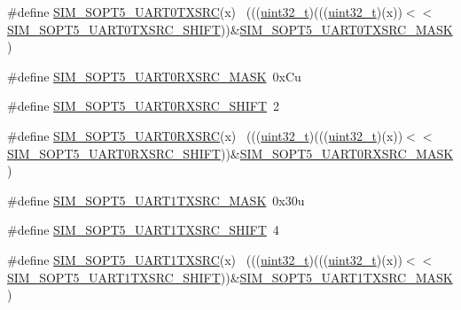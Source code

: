 \begin{DoxyCompactItemize}
\item 
\#define \hyperlink{group___s_i_m___register___masks_gaae8f435ecf7230b287a09bcb1bad59e0}{S\+I\+M\+\_\+\+S\+O\+P\+T5\+\_\+\+U\+A\+R\+T0\+T\+X\+S\+RC}(x)                                ~(((\hyperlink{_p_e___types_8h_a33594304e786b158f3fb30289278f5af}{uint32\+\_\+t})(((\hyperlink{_p_e___types_8h_a33594304e786b158f3fb30289278f5af}{uint32\+\_\+t})(x))$<$$<$\hyperlink{group___s_i_m___register___masks_ga0220b88df4a0747579d24b77f4db4e67}{S\+I\+M\+\_\+\+S\+O\+P\+T5\+\_\+\+U\+A\+R\+T0\+T\+X\+S\+R\+C\+\_\+\+S\+H\+I\+FT}))\&\hyperlink{group___s_i_m___register___masks_ga11646c1292cb7aab3128e1e563847e32}{S\+I\+M\+\_\+\+S\+O\+P\+T5\+\_\+\+U\+A\+R\+T0\+T\+X\+S\+R\+C\+\_\+\+M\+A\+SK})
\item 
\#define \hyperlink{group___s_i_m___register___masks_ga6160de3cd4b7169ac9095c0d0eee46f7}{S\+I\+M\+\_\+\+S\+O\+P\+T5\+\_\+\+U\+A\+R\+T0\+R\+X\+S\+R\+C\+\_\+\+M\+A\+SK}~0x\+Cu
\item 
\#define \hyperlink{group___s_i_m___register___masks_ga27e87f2f792b880bd156907ab20e9910}{S\+I\+M\+\_\+\+S\+O\+P\+T5\+\_\+\+U\+A\+R\+T0\+R\+X\+S\+R\+C\+\_\+\+S\+H\+I\+FT}~2
\item 
\#define \hyperlink{group___s_i_m___register___masks_gae1482daef7671b82d865a1cefd37c8de}{S\+I\+M\+\_\+\+S\+O\+P\+T5\+\_\+\+U\+A\+R\+T0\+R\+X\+S\+RC}(x)                                ~(((\hyperlink{_p_e___types_8h_a33594304e786b158f3fb30289278f5af}{uint32\+\_\+t})(((\hyperlink{_p_e___types_8h_a33594304e786b158f3fb30289278f5af}{uint32\+\_\+t})(x))$<$$<$\hyperlink{group___s_i_m___register___masks_ga27e87f2f792b880bd156907ab20e9910}{S\+I\+M\+\_\+\+S\+O\+P\+T5\+\_\+\+U\+A\+R\+T0\+R\+X\+S\+R\+C\+\_\+\+S\+H\+I\+FT}))\&\hyperlink{group___s_i_m___register___masks_ga6160de3cd4b7169ac9095c0d0eee46f7}{S\+I\+M\+\_\+\+S\+O\+P\+T5\+\_\+\+U\+A\+R\+T0\+R\+X\+S\+R\+C\+\_\+\+M\+A\+SK})
\item 
\#define \hyperlink{group___s_i_m___register___masks_gac473b632c382f785d524c177ff186e0d}{S\+I\+M\+\_\+\+S\+O\+P\+T5\+\_\+\+U\+A\+R\+T1\+T\+X\+S\+R\+C\+\_\+\+M\+A\+SK}~0x30u
\item 
\#define \hyperlink{group___s_i_m___register___masks_ga7714c11e5536dacc90fbc2960e532e94}{S\+I\+M\+\_\+\+S\+O\+P\+T5\+\_\+\+U\+A\+R\+T1\+T\+X\+S\+R\+C\+\_\+\+S\+H\+I\+FT}~4
\item 
\#define \hyperlink{group___s_i_m___register___masks_ga06c2c7dfca35c10b5c05598c2c29e944}{S\+I\+M\+\_\+\+S\+O\+P\+T5\+\_\+\+U\+A\+R\+T1\+T\+X\+S\+RC}(x)                                ~(((\hyperlink{_p_e___types_8h_a33594304e786b158f3fb30289278f5af}{uint32\+\_\+t})(((\hyperlink{_p_e___types_8h_a33594304e786b158f3fb30289278f5af}{uint32\+\_\+t})(x))$<$$<$\hyperlink{group___s_i_m___register___masks_ga7714c11e5536dacc90fbc2960e532e94}{S\+I\+M\+\_\+\+S\+O\+P\+T5\+\_\+\+U\+A\+R\+T1\+T\+X\+S\+R\+C\+\_\+\+S\+H\+I\+FT}))\&\hyperlink{group___s_i_m___register___masks_gac473b632c382f785d524c177ff186e0d}{S\+I\+M\+\_\+\+S\+O\+P\+T5\+\_\+\+U\+A\+R\+T1\+T\+X\+S\+R\+C\+\_\+\+M\+A\+SK})
$$
\end{DoxyCompactItemize}
